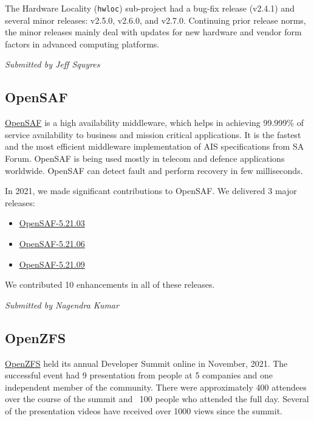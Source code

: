 \documentclass[a4paper]{report}
\begin{document}
The Hardware Locality (\texttt{hwloc}) sub-project had a bug-fix release (v2.4.1) and several minor releases: v2.5.0, v2.6.0, and v2.7.0.  Continuing prior release norms, the minor releases mainly deal with updates for new hardware and vendor form factors in advanced computing platforms.

{\em Submitted by Jeff Squyres}

\subsection{OpenSAF}

\href{https://opensaf.sourceforge.io/}{OpenSAF} is a high availability middleware, which helps in achieving 99.999\% of service availability to business and mission critical applications. It is the fastest and the most efficient middleware implementation of AIS specifications from SA Forum. OpenSAF is being used mostly in telecom and defence applications worldwide. OpenSAF can detect fault and perform recovery in few milliseconds.

In 2021, we made significant contributions to OpenSAF. We delivered 3 major releases:

\begin{itemize}

\item \href{https://sourceforge.net/p/opensaf/wiki/NEWS-5.21.03/}{OpenSAF-5.21.03}

\item \href{https://sourceforge.net/p/opensaf/wiki/NEWS-5.21.06/}{OpenSAF-5.21.06}

\item \href{https://sourceforge.net/p/opensaf/wiki/NEWS-5.21.09/}{OpenSAF-5.21.09}

\end{itemize}

We contributed 10 enhancements in all of these releases.

{\em Submitted by Nagendra Kumar}

\subsection{OpenZFS}

\href{https://openzfs.org/}{OpenZFS} held its annual Developer Summit online in November, 2021. The successful event had 9 presentation from people at 5 companies and one independent member of the community. There were approximately 400 attendees over the course of the summit and ~100 people who attended the full day.  Several of the presentation videos have received over 1000 views since the summit.
\end{document}
